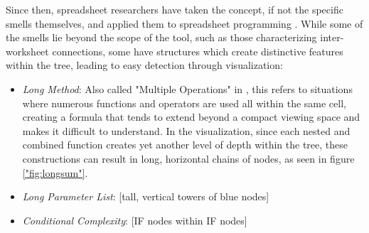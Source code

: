 \documentclass[conference]{IEEEtran}
\begin{document}
	Since then, spreadsheet researchers have taken the concept, if not the specific
	smells themselves, and applied them to spreadsheet programming
	\cite{hermans2012detecting} \cite{cunha2012towards} \cite{jansen2015code}
	\cite{asavametha2012detecting} . While some of the smells lie beyond the 
	scope of the tool, such as those characterizing inter-worksheet connections,
	some have structures which create distinctive features within the tree,
	leading to easy detection through visualization: \par
	
	\begin{itemize}
		\item \textit{Long Method}: Also called "Multiple Operations" in \cite{hermans2012detecting},
		this refers to situations where numerous functions and operators are used all within the same
		cell, creating a formula that tends to extend beyond a compact viewing space and makes it
		difficult to understand. In the visualization, since each nested and combined function creates
		yet another level of depth within the tree, these constructions can result in long, horizontal 
		chains of nodes, as seen in figure \ref{"fig:longsum"}.
		\item \textit{Long Parameter List}: [tall, vertical towers of blue nodes]
		\item \textit{Conditional Complexity}: [IF nodes within IF nodes]
	\end{itemize}
	
\end{document}
